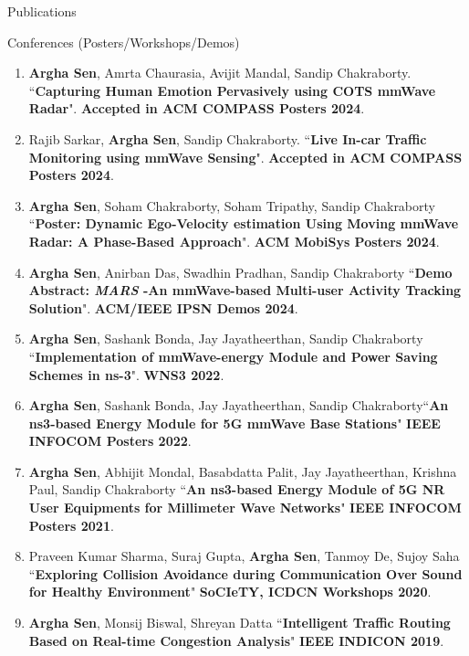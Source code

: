 \documentclass{resume} %
\begin{document}
\begin{rSection}{Publications}
\begin{rSubsection}{Conferences (Posters/Workshops/Demos)}{}{}{}
\begin{enumerate}
			\item \textbf{Argha Sen}, Amrta Chaurasia, Avijit Mandal, Sandip Chakraborty. ``\textbf{Capturing Human Emotion Pervasively using COTS mmWave Radar}". \textbf{Accepted in ACM COMPASS Posters 2024}.
			
			\item Rajib Sarkar, \textbf{Argha Sen}, Sandip Chakraborty. ``\textbf{Live In-car Traffic Monitoring using mmWave Sensing}". \textbf{Accepted in ACM COMPASS Posters 2024}.
			
			\item \textbf{Argha Sen}, Soham Chakraborty, Soham Tripathy, Sandip Chakraborty ``\textbf{Poster: Dynamic Ego-Velocity estimation Using Moving mmWave Radar: A Phase-Based Approach}". \textbf{ACM MobiSys Posters 2024}.
			
			\item \textbf{Argha Sen}, Anirban Das, Swadhin Pradhan, Sandip Chakraborty ``\textbf{Demo Abstract: \textit{MARS} -An mmWave-based Multi-user Activity Tracking Solution}". \textbf{ACM/IEEE IPSN Demos 2024}.
			
			\item \textbf{Argha Sen}, Sashank Bonda, Jay Jayatheerthan, Sandip Chakraborty ``\textbf{Implementation of mmWave-energy Module and Power Saving Schemes in ns-3}". \textbf{WNS3 2022}.
			
			\item \textbf{Argha Sen}, Sashank Bonda, Jay Jayatheerthan, Sandip Chakraborty``\textbf{An ns3-based Energy Module for 5G mmWave Base Stations}" \textbf{IEEE INFOCOM Posters 2022}.
			
			\item \textbf{Argha Sen}, Abhijit Mondal, Basabdatta Palit, Jay Jayatheerthan, Krishna Paul, Sandip Chakraborty ``\textbf{An ns3-based Energy Module of 5G NR User Equipments for Millimeter Wave Networks}" \textbf{IEEE INFOCOM Posters 2021}.
			
			\item Praveen Kumar Sharma, Suraj Gupta, \textbf{Argha Sen}, Tanmoy De, Sujoy Saha ``\textbf{Exploring Collision Avoidance during Communication Over Sound for Healthy Environment}" \textbf{SoCIeTY, ICDCN Workshops 2020}.
			
			\item \textbf{Argha Sen}, Monsij Biswal, Shreyan Datta ``\textbf{Intelligent Traffic Routing Based on Real-time Congestion Analysis}" \textbf{IEEE INDICON 2019}.
			
			\end{enumerate}
			
		\end{rSubsection}{}{}{}{}
		
	\end{rSection}
	
\end{document}
